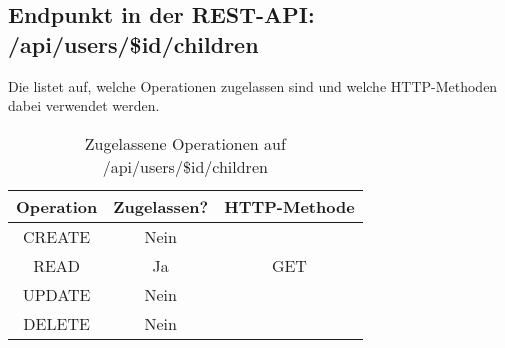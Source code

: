 \subsection{Endpunkt in der REST-API: /api/users/\$id/children}
Die  listet auf, welche Operationen zugelassen sind und welche HTTP-Methoden dabei verwendet werden. 

\begin{table}[!htbp]
	\begin{tabular}{|c|c|c|}
		\hline
			\textbf{Operation} & \textbf{Zugelassen?} & \textbf{HTTP-Methode} \\ \hline
			CREATE & Nein &  \\ \hline 
			READ & Ja & GET \\ \hline
			UPDATE & Nein & \\ \hline 
			DELETE & Nein & \\ \hline
	\end{tabular}

		\caption{Zugelassene Operationen auf /api/users/\$id/children}
		\label{tab:rest:api:users:id:children:meth}
\end{table}

